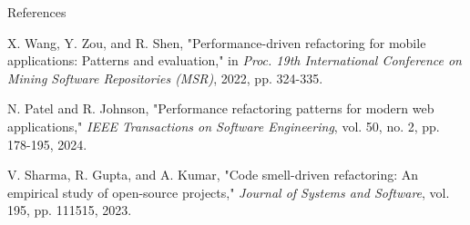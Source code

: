 \documentclass{beamer}
\begin{document}
\begin{frame}[allowframebreaks]{References}
\begin{thebibliography}{10}
         X. Wang, Y. Zou, and R. Shen, "Performance-driven refactoring for mobile applications: Patterns and evaluation," in \textit{Proc. 19th International Conference on Mining Software Repositories (MSR)}, 2022, pp. 324-335.
        
         N. Patel and R. Johnson, "Performance refactoring patterns for modern web applications," \textit{IEEE Transactions on Software Engineering}, vol. 50, no. 2, pp. 178-195, 2024.
        
         V. Sharma, R. Gupta, and A. Kumar, "Code smell-driven refactoring: An empirical study of open-source projects," \textit{Journal of Systems and Software}, vol. 195, pp. 111515, 2023.
    \end{thebibliography}
\end{frame}
\end{document}
